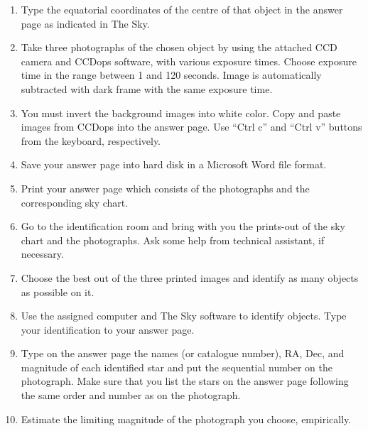 \begin{enumerate}
  ``Ctrl c'' and ``Ctrl v'' buttons from the keyboard, respectively.
\item Type the equatorial coordinates of the centre of that object in the
  answer page as indicated in The Sky.
\item Take three photographs of the chosen object by using the attached CCD
  camera and CCDops software, with various exposure times. Choose exposure
  time in the range between 1 and 120 seconds. Image is automatically
  subtracted with dark frame with the same exposure time.
\item You must invert the background images into white color. Copy and paste
  images from CCDops into the answer page. Use ``Ctrl c'' and ``Ctrl v''
  buttons from the keyboard, respectively.
\item Save your answer page into hard disk in a Microsoft Word file format.
\item Print your answer page which consists of the photographs and the
  corresponding sky chart.
\item Go to the identification room and bring with you the prints-out of the
  sky chart and the photographs. Ask some help from technical assistant, if
  necessary.
\item Choose the best out of the three printed images and identify as many
  objects as possible on it.
\item Use the assigned computer and The Sky software to identify objects.
  Type your identification to your answer page.
\item Type on the answer page the names (or catalogue number), RA, Dec, and
  magnitude of each identified star and put the sequential number on the
  photograph. Make sure that you list the stars on the answer page following
  the same order and number as on the photograph.
\item Estimate the limiting magnitude of the photograph you choose,
  empirically.
\end{enumerate}
